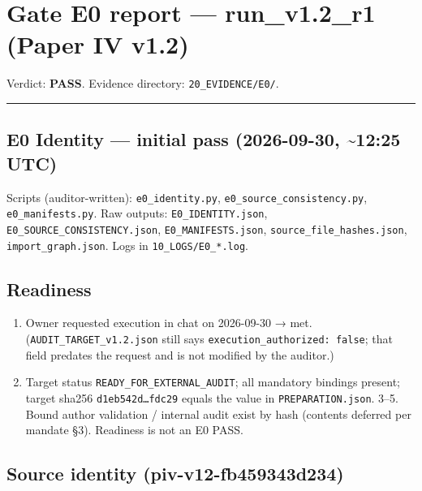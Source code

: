 \documentclass[
]{article}
\author{}
\date{}
\providecommand{\tightlist}{%
  \setlength{\itemsep}{0pt}\setlength{\parskip}{0pt}}
\begin{document}
\section{Gate E0 report --- run\_v1.2\_r1 (Paper IV
v1.2)}\label{gate-e0-report--run_v12_r1-paper-iv-v12}

Verdict: \textbf{PASS}. Evidence directory: \texttt{20\_EVIDENCE/E0/}.

\begin{center}\rule{0.5\linewidth}{0.5pt}\end{center}

\subsection{E0 Identity --- initial pass (2026-09-30,
\textasciitilde12:25
UTC)}\label{e0-identity--initial-pass-2026-09-30-1225-utc}

Scripts (auditor-written): \texttt{e0\_identity.py},
\texttt{e0\_source\_consistency.py}, \texttt{e0\_manifests.py}. Raw
outputs: \texttt{E0\_IDENTITY.json},
\texttt{E0\_SOURCE\_CONSISTENCY.json}, \texttt{E0\_MANIFESTS.json},
\texttt{source\_file\_hashes.json}, \texttt{import\_graph.json}. Logs in
\texttt{10\_LOGS/E0\_*.log}.

\subsection{Readiness}\label{readiness}

\begin{enumerate}
\def\labelenumi{\arabic{enumi}.}
\tightlist
\item
  Owner requested execution in chat on 2026-09-30 → met.
  (\texttt{AUDIT\_TARGET\_v1.2.json} still says
  \texttt{execution\_authorized:\ false}; that field predates the
  request and is not modified by the auditor.)
\item
  Target status \texttt{READY\_FOR\_EXTERNAL\_AUDIT}; all mandatory
  bindings present; target sha256 \texttt{d1eb542d…fdc29} equals the
  value in \texttt{PREPARATION.json}. 3--5. Bound author validation /
  internal audit exist by hash (contents deferred per mandate §3).
  Readiness is not an E0 PASS.
\end{enumerate}

\subsection{Source identity
(piv-v12-fb459343d234)}\label{source-identity-piv-v12-fb459343d234}
\end{document}
